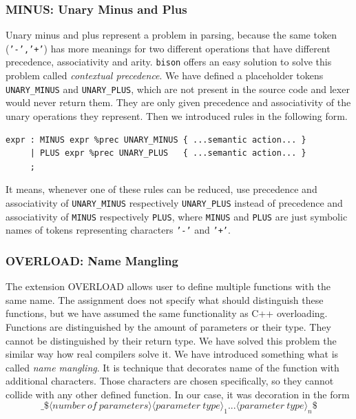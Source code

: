 \documentclass[12pt]{article}
\begin{document}
\subsubsection{MINUS: Unary Minus and Plus}
Unary minus and plus represent a problem in parsing, because the same token (\texttt{'-','+'}) has more meanings for two
different operations that have different precedence, associativity and arity. \texttt{bison} offers an easy solution to solve
this problem called \emph{contextual precedence}. We have defined a placeholder tokens \texttt{UNARY\_MINUS} and \texttt{UNARY\_PLUS},
which are not present in the source code and lexer would never return them. They are only given precedence and associativity of
the unary operations they represent. Then we introduced rules in the following form.
\begin{lstlisting}
expr : MINUS expr %prec UNARY_MINUS { ...semantic action... }
     | PLUS expr %prec UNARY_PLUS   { ...semantic action... }
     ;
\end{lstlisting}

It means, whenever one of these rules can be reduced, use precedence and associativity of \texttt{UNARY\_MINUS} respectively \texttt{UNARY\_PLUS}
instead of precedence and associativity of \texttt{MINUS} respectively \texttt{PLUS}, where \texttt{MINUS} and \texttt{PLUS} are just symbolic
names of tokens representing characters \texttt{'-'} and \texttt{'+'}.

\subsubsection{OVERLOAD: Name Mangling}
\label{sec:mangling}
The extension OVERLOAD allows user to define multiple functions with the same name. The assignment does not specify what should distinguish these functions,
but we have assumed the same functionality as C++ overloading. Functions are distinguished by the amount of parameters or their type. They cannot be distinguished
by their return type. We have solved this problem the similar way how real compilers solve it. We have introduced something what is called \emph{name mangling}.
It is technique that decorates name of the function with additional characters. Those characters are chosen specifically, so they cannot collide with any other
defined function. In our case, it was decoration in the form
\begin{equation*}
	\texttt{\_\$}\langle number\ of\ parameters \rangle\langle parameter\ type\rangle_{1}...\langle parameter\ type\rangle_{n}\texttt{\$}
\end{equation*}
\end{document}
